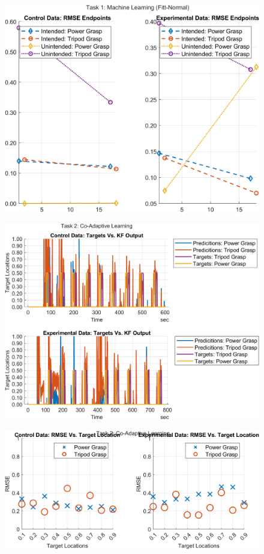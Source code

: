 \documentclass[12pt]{article}
\newcommand\figWidth{7in}
\newcommand\figWidthLarge{7in}
\begin{document}
\begin{figure}
    \includegraphics[width = \figWidth]{t1-spaghetti-fnorm.png}
\end{figure}
\begin{landscape}
    \begin{figure}
        \includegraphics[width = \figWidthLarge]{t2-kf-out.png}
    \end{figure}
\end{landscape}
\begin{figure}
    \includegraphics[width = \figWidth]{t2-rmse-reg.png}
\end{figure}
\end{document}
